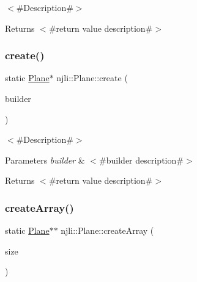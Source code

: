 $<$\#\+Description\#$>$

\begin{DoxyReturn}{Returns}
$<$\#return value description\#$>$ 
\end{DoxyReturn}
\mbox{\label{classnjli_1_1_plane_afa389a6efdc6ea1c74c923bd82b6445a}} 
\subsubsection{\texorpdfstring{create()}{create()}\hspace{0.1cm}{\footnotesize\ttfamily [2/2]}}
{\footnotesize\ttfamily static \mbox{\hyperlink{classnjli_1_1_plane}{Plane}}$\ast$ njli\+::\+Plane\+::create (\begin{DoxyParamCaption}\item[{const \mbox{\hyperlink{classnjli_1_1_plane_builder}{Plane\+Builder}} \&}]{builder }\end{DoxyParamCaption})\hspace{0.3cm}{\ttfamily [static]}}

$<$\#\+Description\#$>$


\begin{DoxyParams}{Parameters}
{\em builder} & $<$\#builder description\#$>$\\
\hline
\end{DoxyParams}
\begin{DoxyReturn}{Returns}
$<$\#return value description\#$>$ 
\end{DoxyReturn}
\mbox{\label{classnjli_1_1_plane_abdba856cfdd6d38b011dfe684a4dde19}} 
\subsubsection{\texorpdfstring{create\+Array()}{createArray()}}
{\footnotesize\ttfamily static \mbox{\hyperlink{classnjli_1_1_plane}{Plane}}$\ast$$\ast$ njli\+::\+Plane\+::create\+Array (\begin{DoxyParamCaption}\item[{const \mbox{\hyperlink{_util_8h_a10e94b422ef0c20dcdec20d31a1f5049}{u32}}}]{size }\end{DoxyParamCaption})\hspace{0.3cm}{\ttfamily [static]}}

